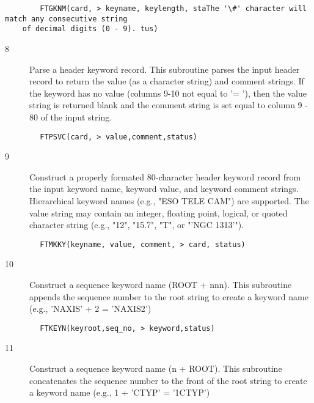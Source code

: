 \documentclass[11pt]{book}
\begin{document}
\begin{verbatim}
        FTGKNM(card, > keyname, keylength, staThe '\#' character will match any consecutive string
    of decimal digits (0 - 9). tus)
\end{verbatim}

\begin{description}
\item[8 ] Parse a header keyword record.
    This subroutine parses the input header record to return the value (as
    a character string) and comment strings.  If the keyword has no
    value (columns 9-10 not equal to '= '), then the value string is returned
    blank and the comment string is set equal to column 9 - 80 of the
   input string.
\end{description}

\begin{verbatim}
        FTPSVC(card, > value,comment,status)
\end{verbatim}

\begin{description}
\item[9 ] Construct a properly formated 80-character header keyword record from the
    input keyword name, keyword value, and keyword comment strings.
    Hierarchical keyword names (e.g., "ESO TELE CAM") are supported.
    The value string may contain an integer, floating point, logical, or
    quoted character string (e.g., "12", "15.7", "T",
    or "'NGC 1313'").
\end{description}

\begin{verbatim}
        FTMKKY(keyname, value, comment, > card, status)
\end{verbatim}

\begin{description}
\item[10] Construct a sequence keyword name (ROOT + nnn).
    This subroutine appends the sequence number to the root string to create
   a keyword name (e.g., 'NAXIS' + 2 = 'NAXIS2')
\end{description}

\begin{verbatim}
        FTKEYN(keyroot,seq_no, > keyword,status)
\end{verbatim}

\begin{description}
\item[11] Construct a sequence keyword name (n + ROOT).
    This subroutine concatenates the sequence number to the front of the
   root string to create a keyword name (e.g., 1 + 'CTYP' = '1CTYP')
\end{description}
\end{document}
